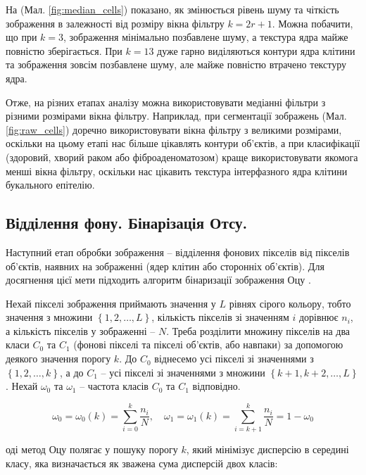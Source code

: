 На (Мал. \ref{fig:median_cells}) показано, як змінюється рівень шуму та чіткість зображення в залежності від розміру вікна фільтру \(k = 2r + 1\). Можна побачити, що при \(k = 3\), зображення мінімально позбавлене шуму, а текстура ядра майже повністю зберігається. При \(k = 13\) дуже гарно виділяються контури ядра клітини та зображення зовсім позбавлене шуму, але майже повністю втрачено текстуру ядра.

Отже, на різних етапах аналізу можна використовувати медіанні фільтри з різними розмірами вікна фільтру. Наприклад, при сегментації зображень (Мал. \ref{fig:raw_cells}) доречно використовувати вікна фільтру з великими розмірами, оскільки на цьому етапі нас більше цікавлять контури об'єктів, а при класифікації (здоровий, хворий раком або фіброаденоматозом) краще використовувати якомога менші вікна фільтру, оскільки нас цікавить текстура інтерфазного ядра клітини букального епітелію.


\subsection{Відділення фону. Бінарізація Отсу.}

\par
Наступний етап обробки зображення -- відділення фонових пікселів від пікселів об'єктів, наявних на зображенні (ядер клітин або сторонніх об'єктів). Для досягнення цієї мети підходить алгоритм бінаризації зображення Оцу \parencite{bib:otsu}. 

\par

Нехай пікселі зображення приймають значення у $L$ рівнях сірого кольору, тобто значення з множини $\left\{ 1, 2, \dots, L \right\}$, кількість пікселів зі значенням $i$ дорівнює $n_i$, а кількість пікселів у зображенні -- $N$. Треба розділити множину пікселів на два класи $C_0$ та $C_1$ (фонові пікселі та пікселі об'єктів, або навпаки) за допомогою деякого значення порогу $k$. До $C_0$ віднесемо усі пікселі зі значеннями з $\left\{ 1, 2, \dots, k \right\}$, а до $C_1$ -- усі пікселі зі значеннями з множини $\left\{ k+1, k+2, \dots, L \right\}$. Нехай $\omega_0$ та $\omega_1$ -- частота класів $C_0$ та $C_1$ відповідно.  

$$\omega_0 = \omega_0(k) = \sum_{i=0}^{k}{\frac{n_i}{N}}, \quad
\omega_1 = \omega_1(k) = \sum_{i=k+1}^{k}{\frac{n_i}{N}} = 1 - \omega_0$$

оді метод Оцу полягає у пошуку порогу $k$, який мінімізує дисперсію в середині класу, яка визначається як зважена сума дисперсій двох класів:

